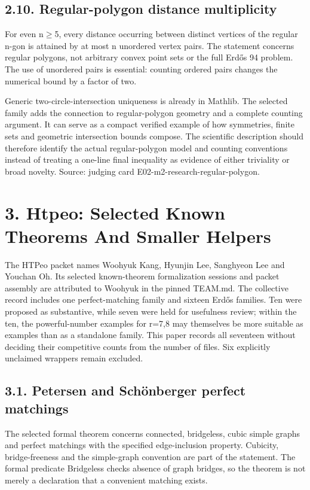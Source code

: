 \documentclass[11pt,a4paper]{article}
\begin{document}
\subsection{2.10. Regular-polygon distance multiplicity}
For even n\ensuremath{\geq}5, every distance occurring between distinct vertices of the regular n-gon is attained by at most n unordered vertex pairs. The statement concerns regular polygons, not arbitrary convex point sets or the full Erdős 94 problem. The use of unordered pairs is essential: counting ordered pairs changes the numerical bound by a factor of two.

Generic two-circle-intersection uniqueness is already in Mathlib. The selected family adds the connection to regular-polygon geometry and a complete counting argument. It can serve as a compact verified example of how symmetries, finite sets and geometric intersection bounds compose. The scientific description should therefore identify the actual regular-polygon model and counting conventions instead of treating a one-line final inequality as evidence of either triviality or broad novelty. Source: judging card E02-m2-research-regular-polygon.

\section{3. Htpeo: Selected Known Theorems And Smaller Helpers}
The HTPeo packet names Woohyuk Kang, Hyunjin Lee, Sanghyeon Lee and Youchan Oh. Its selected known-theorem formalization sessions and packet assembly are attributed to Woohyuk in the pinned TEAM.md. The collective record includes one perfect-matching family and sixteen Erdős families. Ten were proposed as substantive, while seven were held for usefulness review; within the ten, the powerful-number examples for r=7,8 may themselves be more suitable as examples than as a standalone family. This paper records all seventeen without deciding their competitive counts from the number of files. Six explicitly unclaimed wrappers remain excluded.

\subsection{3.1. Petersen and Schönberger perfect matchings}
The selected formal theorem concerns connected, bridgeless, cubic simple graphs and perfect matchings with the specified edge-inclusion property. Cubicity, bridge-freeness and the simple-graph convention are part of the statement. The formal predicate Bridgeless checks absence of graph bridges, so the theorem is not merely a declaration that a convenient matching exists.
\end{document}
